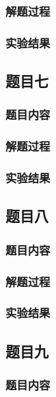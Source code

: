 \documentclass[11pt,a4paper]{ctexart}
\begin{document}
\subsubsection{解题过程}
\mbox{}

\subsubsection{实验结果}
\mbox{}

\subsection{题目七}
\subsubsection{题目内容}
\mbox{}

\subsubsection{解题过程}
\mbox{}

\subsubsection{实验结果}
\mbox{}

\subsection{题目八}
\subsubsection{题目内容}
\mbox{}

\subsubsection{解题过程}
\mbox{}

\subsubsection{实验结果}
\mbox{}

\subsection{题目九}
\subsubsection{题目内容}
\mbox{}
\end{document}

